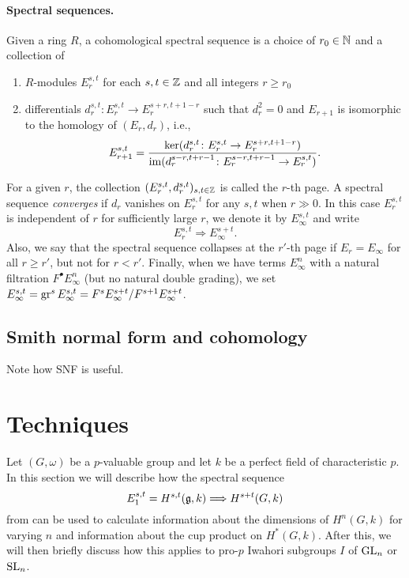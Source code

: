 \paragraph{Spectral sequences.} Given a ring $R$, a cohomological spectral sequence is a choice of $r_0 \in \mathbb{N}$ and a collection of
\begin{enumerate}[$\bullet$]
  \item $R$-modules $E_r^{s,t}$ for each $s,t \in \mathbb{Z}$ and all integers $r \geq r_0$
  \item differentials $d_r^{s,t} \colon E_r^{s,t} \to E_r^{s+r,t+1-r}$ such that $d_r^2 = 0$ and $E_{r+1}$ is isomorphic to the homology of $(E_r,d_r)$, i.e.,
  \[
    E_{r+1}^{s,t} = \frac{\operatorname{ker}(d_r^{s,t} \colon E_r^{s,t} \to E_r^{s+r,t+1-r})}{\operatorname{im}(d_r^{s-r,t+r-1} \colon E_r^{s-r,t+r-1} \to E_r^{s,t})}.
  \]
\end{enumerate}
For a given $r$, the collection $(E_r^{s,t},d_r^{s,t})_{s,t\in\mathbb{Z}}$ is called the $r$-th page. A spectral sequence \emph{converges} if $d_r$ vanishes on $E_r^{s,t}$ for any $s,t$ when $r\gg0$. In this case $E_r^{s,t}$ is independent of $r$ for sufficiently large $r$, we denote it by $E_{\infty}^{s,t}$ and write
  \[
    E_{r}^{s,t} \Longrightarrow E_\infty^{s+t}.
  \]
Also, we say that the spectral sequence collapses at the $r'$-th page if $E_{r} = E_{\infty}$ for all $r \geq r'$, but not for $r < r'$. Finally, when we have terms $E_\infty^{n}$  with a natural filtration $F^\bullet E_\infty^n$ (but no natural double grading), we set $E_\infty^{s,t} = \operatorname{gr}^{s} E_\infty^{s,t}= F^{s}E_\infty^{s+t}/F^{s+1}E_\infty^{s+t}$.

\subsection{Smith normal form and cohomology}%
\label{subsec:SNF-coh}

Note how SNF is useful.

\section{Techniques}%
\label{sec:tech-iwa}

Let $(G, \omega)$ be a $p$-valuable group and let $k$ be a perfect field of characteristic $p$. In this section we will describe how the spectral sequence
\begin{equation*}
  E_{1}^{s,t} = H^{s,t}(\mathfrak{g}, k) \Longrightarrow H^{s+t}(G, k)
\end{equation*}
from \cite[§6.1]{Sor} can be used to calculate information about the dimensions of $H^{n}(G,k)$ for varying $n$ and information about the cup product on $H^{*}(G,k)$. After this, we will then briefly discuss how this applies to pro-$p$ Iwahori subgroups $I$ of $\operatorname{GL}_{n}$ or $\operatorname{SL}_{n}$.



